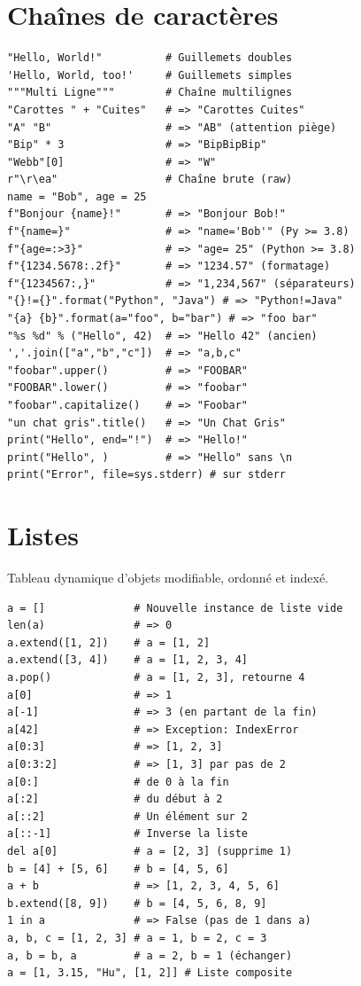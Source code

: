 \documentclass{article}
\begin{document}
\begin{multicols*}{4}
\section*{Chaînes de caractères}

\begin{lstlisting}
"Hello, World!"          # Guillemets doubles
'Hello, World, too!'     # Guillemets simples
"""Multi Ligne"""        # Chaîne multilignes
"Carottes " + "Cuites"   # => "Carottes Cuites"
"A" "B"                  # => "AB" (attention piège)
"Bip" * 3                # => "BipBipBip"
"Webb"[0]                # => "W"
r"\r\ea"                 # Chaîne brute (raw)
name = "Bob", age = 25
f"Bonjour {name}!"       # => "Bonjour Bob!"
f"{name=}"               # => "name='Bob'" (Py >= 3.8)
f"{age=:>3}"             # => "age= 25" (Python >= 3.8)
f"{1234.5678:.2f}"       # => "1234.57" (formatage)
f"{1234567:,}"           # => "1,234,567" (séparateurs)
"{}!={}".format("Python", "Java") # => "Python!=Java"
"{a} {b}".format(a="foo", b="bar") # => "foo bar"
"%s %d" % ("Hello", 42)  # => "Hello 42" (ancien)
','.join(["a","b","c"])  # => "a,b,c"
"foobar".upper()         # => "FOOBAR"
"FOOBAR".lower()         # => "foobar"
"foobar".capitalize()    # => "Foobar"
"un chat gris".title()   # => "Un Chat Gris"
print("Hello", end="!")  # => "Hello!"
print("Hello", )         # => "Hello" sans \n
print("Error", file=sys.stderr) # sur stderr
\end{lstlisting}

\section*{Listes}
Tableau dynamique d'objets modifiable, ordonné et indexé.
\begin{lstlisting}
a = []              # Nouvelle instance de liste vide
len(a)              # => 0
a.extend([1, 2])    # a = [1, 2]
a.extend([3, 4])    # a = [1, 2, 3, 4]
a.pop()             # a = [1, 2, 3], retourne 4
a[0]                # => 1
a[-1]               # => 3 (en partant de la fin)
a[42]               # => Exception: IndexError
a[0:3]              # => [1, 2, 3]
a[0:3:2]            # => [1, 3] par pas de 2
a[0:]               # de 0 à la fin
a[:2]               # du début à 2
a[::2]              # Un élément sur 2
a[::-1]             # Inverse la liste
del a[0]            # a = [2, 3] (supprime 1)
b = [4] + [5, 6]    # b = [4, 5, 6]
a + b               # => [1, 2, 3, 4, 5, 6]
b.extend([8, 9])    # b = [4, 5, 6, 8, 9]
1 in a              # => False (pas de 1 dans a)
a, b, c = [1, 2, 3] # a = 1, b = 2, c = 3
a, b = b, a         # a = 2, b = 1 (échanger)
a = [1, 3.15, "Hu", [1, 2]] # Liste composite
\end{lstlisting}


\end{multicols*}
\end{document}
